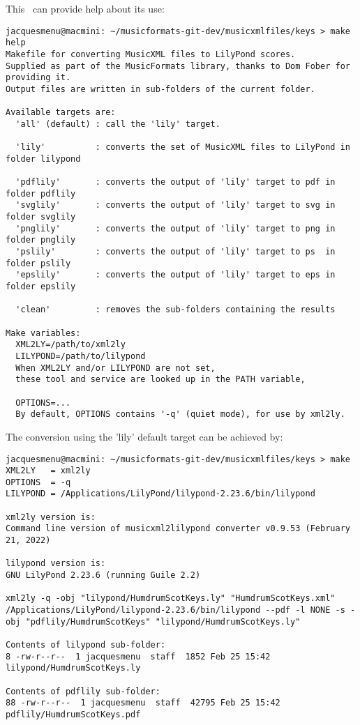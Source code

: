 This \Makefile\ can provide help about its use:
\begin{lstlisting}[language=Terminal]
jacquesmenu@macmini: ~/musicformats-git-dev/musicxmlfiles/keys > make help
Makefile for converting MusicXML files to LilyPond scores.
Supplied as part of the MusicFormats library, thanks to Dom Fober for providing it.
Output files are written in sub-folders of the current folder.

Available targets are:
  'all' (default) : call the 'lily' target.

  'lily'          : converts the set of MusicXML files to LilyPond in folder lilypond

  'pdflily'       : converts the output of 'lily' target to pdf in folder pdflily
  'svglily'       : converts the output of 'lily' target to svg in folder svglily
  'pnglily'       : converts the output of 'lily' target to png in folder pnglily
  'pslily'        : converts the output of 'lily' target to ps  in folder pslily
  'epslily'       : converts the output of 'lily' target to eps in folder epslily

  'clean'         : removes the sub-folders containing the results

Make variables:
  XML2LY=/path/to/xml2ly
  LILYPOND=/path/to/lilypond
  When XML2LY and/or LILYPOND are not set,
  these tool and service are looked up in the PATH variable,

  OPTIONS=...
  By default, OPTIONS contains '-q' (quiet mode), for use by xml2ly.
\end{lstlisting}

The conversion using the 'lily' default target can be achieved by:
\begin{lstlisting}[language=Terminal]
jacquesmenu@macmini: ~/musicformats-git-dev/musicxmlfiles/keys > make
XML2LY   = xml2ly
OPTIONS  = -q
LILYPOND = /Applications/LilyPond/lilypond-2.23.6/bin/lilypond

xml2ly version is:
Command line version of musicxml2lilypond converter v0.9.53 (February 21, 2022)

lilypond version is:
GNU LilyPond 2.23.6 (running Guile 2.2)

xml2ly -q -obj "lilypond/HumdrumScotKeys.ly" "HumdrumScotKeys.xml"
/Applications/LilyPond/lilypond-2.23.6/bin/lilypond --pdf -l NONE -s -obj "pdflily/HumdrumScotKeys" "lilypond/HumdrumScotKeys.ly"

Contents of lilypond sub-folder:
8 -rw-r--r--  1 jacquesmenu  staff  1852 Feb 25 15:42 lilypond/HumdrumScotKeys.ly

Contents of pdflily sub-folder:
88 -rw-r--r--  1 jacquesmenu  staff  42795 Feb 25 15:42 pdflily/HumdrumScotKeys.pdf
\end{lstlisting}


